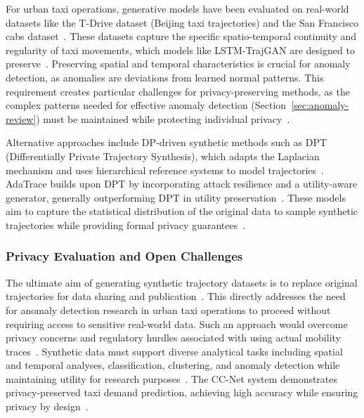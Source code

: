 \documentclass[runningheads]{llncs}
\begin{document}
For urban taxi operations, generative models have been evaluated on real-world datasets like the T-Drive dataset (Beijing taxi trajectories) and the San Francisco cabs dataset~\cite{maTrajectoryPrivacyProtection2021,primaultDifferentiallyPrivateLocation2014,primaultLongRoadComputational2019}. These datasets capture the specific spatio-temporal continuity and regularity of taxi movements, which models like LSTM-TrajGAN are designed to preserve~\cite{raoLSTMTrajGANDeepLearning2020a,liuTrajGANsUsingGenerative2018,jinSurveyExperimentalStudy2023}. Preserving spatial and temporal characteristics is crucial for anomaly detection, as anomalies are deviations from learned normal patterns. This requirement creates particular challenges for privacy-preserving methods, as the complex patterns needed for effective anomaly detection (Section~\ref{sec:anomaly-review}) must be maintained while protecting individual privacy~\cite{raoLSTMTrajGANDeepLearning2020a,naghizadePrivacyContextawareRelease2020}.

Alternative approaches include DP-driven synthetic methods such as DPT (Differentially Private Trajectory Synthesis), which adapts the Laplacian mechanism and uses hierarchical reference systems to model trajectories~\cite{chenDifferentiallyPrivateTrajectory2011,jinSurveyExperimentalStudy2023}. AdaTrace builds upon DPT by incorporating attack resilience and a utility-aware generator, generally outperforming DPT in utility preservation~\cite{jinSurveyExperimentalStudy2023}. These models aim to capture the statistical distribution of the original data to sample synthetic trajectories while providing formal privacy guarantees~\cite{jinSurveyExperimentalStudy2023,quGenerativeAdversarialNetworks2020}.

\subsubsection{Privacy Evaluation and Open Challenges}

The ultimate aim of generating synthetic trajectory datasets is to replace original trajectories for data sharing and publication~\cite{buchholzSystematisationKnowledgeTrajectory2024,raoLSTMTrajGANDeepLearning2020a,liuTrajGANsUsingGenerative2018}. This directly addresses the need for anomaly detection research in urban taxi operations to proceed without requiring access to sensitive real-world data. Such an approach would overcome privacy concerns and regulatory hurdles associated with using actual mobility traces~\cite{buchholzSystematisationKnowledgeTrajectory2024,raoLSTMTrajGANDeepLearning2020a,liuTrajGANsUsingGenerative2018}. Synthetic data must support diverse analytical tasks including spatial and temporal analyses, classification, clustering, and anomaly detection while maintaining utility for research purposes~\cite{raoLSTMTrajGANDeepLearning2020a,chenDifferentiallyPrivateTrajectory2011}. The CC-Net system demonstrates privacy-preserved taxi demand prediction, achieving high accuracy while ensuring privacy by design~\cite{ozekiBalancingPrivacyUtility2023}.
\end{document}
